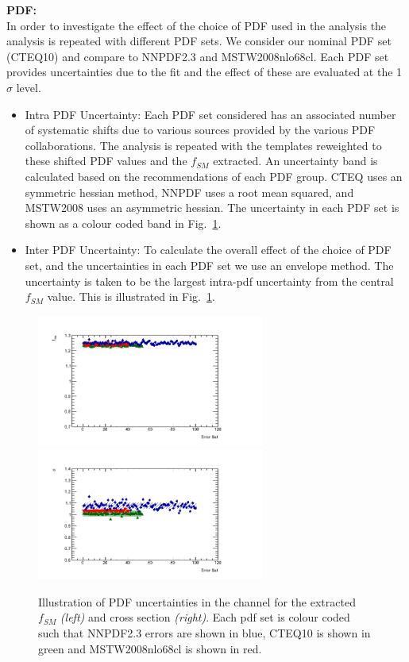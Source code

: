 \vspace{5mm}
\noindent
\textbf{PDF:}\\
In order to investigate the effect of the choice of PDF used in the analysis the analysis is repeated with different PDF sets. We consider our nominal PDF set (CTEQ10) and compare to NNPDF2.3 and MSTW2008nlo68cl. Each PDF set provides uncertainties due to the fit and the effect of these are evaluated at the 1 $\sigma$ level.
\begin{itemize}
  \item Intra PDF Uncertainty: Each PDF set considered has an associated number of systematic shifts due to various sources provided by the various PDF collaborations. The analysis is repeated with the templates reweighted to these shifted PDF values and the $f_{SM}$ extracted. An uncertainty band is calculated based on the recommendations of each PDF group. CTEQ uses an symmetric hessian method, NNPDF uses a root mean squared, and MSTW2008 uses an asymmetric hessian. The uncertainty in each PDF set is shown as a colour coded band in Fig.~\ref{fig:pdf}.
  \item Inter PDF Uncertainty: To calculate the overall effect of the choice of PDF set, and the uncertainties in each PDF set we use an envelope method. The uncertainty is taken to be the largest intra-pdf uncertainty from the central $f_{SM}$ value. This is illustrated in Fig.~\ref{fig:pdf}.
\end{itemize}

\begin{figure}[h]
	\begin{center}
	\includegraphics[width = 75mm]{f/delta_phi10emu_pdf_fsm}
	\includegraphics[width = 75mm]{f/delta_phi10emu_pdf_xsec}
	\end{center}
        \caption{Illustration of PDF uncertainties in the \emu channel for the extracted $f_{SM}$ \emph{(left)} and cross section \emph{(right)}. Each pdf set is colour coded such that NNPDF2.3 errors are shown in blue, CTEQ10 is shown in green and MSTW2008nlo68cl is shown in red.}
        \label{fig:pdf}
\end{figure}

